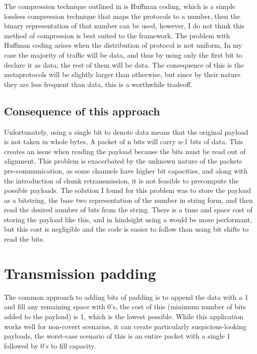 The compression technique outlined in  is Huffman coding, which is a simple lossless compression technique that maps the protocols to a number, then the binary representation of that number can be used, however, I do not think this method of compression is best suited to the framework. The problem with Huffman coding arises when the distribution of protocol is not uniform, In my case the majority of traffic will be data, and thus by using only the first bit to declare it as data, the rest of them will be data. The consequence of this is the metaprotocols will be slightly larger than otherwise, but since by their nature they are less frequent than data, this is a worthwhile tradeoff.

\subsection{Consequence of this approach}
\label{sec:mp_consequence}

Unfortunately, using a single bit to denote data means that the original payload is not taken in whole bytes, A packet of n bits will carry n-1 bits of data. This creates an issue when reading the payload because the bits must be read out of alignment. This problem is exacerbated by the unknown nature of the packets pre-communication, as some channels have higher bit capacities, and along with the introduction of chunk retransmission, it is not feasible to precompute the possible payloads. The solution I found for this problem was to store the payload as a bitstring, the base two representation of the number in string form, and then read the desired number of bits from the string. There is a time and space cost of storing the payload like this, and in hindsight using a  would be more performant, but this cost is negligible and the code is easier to follow than using bit shifts to read the bits.

\section{Transmission padding}
\label{sec:transmission_padding}

The common approach to adding bits of padding is to append the data with a 1 and fill any remaining space with 0's, the cost of this (minimum number of bits added to the payload) is 1, which is the lowest possible. While this application works well for non-covert scenarios, it can create particularly suspicious-looking payloads, the worst-case scenario of this is an entire packet with a single 1 followed by 0's to fill capacity.

